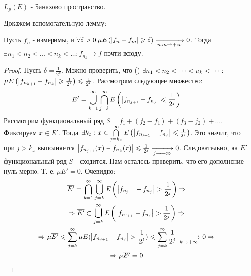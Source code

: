 \begin{theorem}
	$L_p(E) $ - Банахово пространство.
\end{theorem}

Докажем вспомогательную лемму:

\begin{lemma}
	Пусть $f_n$ - измеримы, и $\forall\delta > 0\: \mu E\left(\left|f_n - f_m\right| \geqslant \delta\right) \xrightarrow[n,m \rightarrow +\infty]{} 0$.
	Тогда $\exists n_1 < n_2 < \dots < n_k < \dots : f_{n_k} \rightarrow f$ почти всюду.
\end{lemma}

\begin{proof}
	Пусть $\delta = \frac{1}{2^k}$. Можно проверить, что (\todo) 
	$\exists n_1 < n_2 < \dots < n_k < \dots: \\$
	$\mu E\left(\left|f_{n_{k + 1}} - f_{n_k}\right| \geqslant \frac{1}{2^k}\right) \leqslant \frac{1}{2^k}$.
	Рассмотрим следующее множество:
	\begin{gather*}
		E' = \bigcup\limits_{k = 1}^{\infty}\bigcap\limits_{j = k}^{\infty} E\left(\left|f_{n_{j + 1}} - f_{n_j}\right| \leqslant \frac{1}{2^j} \right)
	\end{gather*}
	Рассмотрим функциональный ряд $S = f_1 + (f_2 - f_1) + (f_3 - f_2) + \dots$. Фиксируем $x \in E'$. Тогда 
	$\\ \exists k_x : x \in \bigcap\limits_{j = k_x}^{\infty} E\left(\left|f_{n_{j + 1}} - f_{n_j}\right| \leqslant \frac{1}{2^j} \right)$.
	Это значит, что при $j > k_x$ выполняется $\left|f_{n_{j + 1}}(x) - f_{n_k}(x)\right| \leqslant \frac{1}{2^j} \xrightarrow[j \rightarrow +\infty]{} 0$.
	Следовательно, на $E'$ функциональный ряд $S$ - сходится. 
	Нам осталось проверить, что его дополнение нуль-мерно.
	Т. е. $\mu \overline{E'} = 0$. Очевидно:
	\begin{gather*}
		\overline{E'} = \bigcap\limits_{k = 1}^{\infty}\bigcup\limits_{j = k}^{\infty} E\left(\left|f_{n_{j + 1}} - f_{n_j}\right| > \frac{1}{2^j} \right) \Rightarrow \\
		\Rightarrow \overline{E'} \subset \bigcup\limits_{j = k}^{\infty} E\left(\left|f_{n_{j + 1}} - f_{n_j}\right| > \frac{1}{2^j} \right) \Rightarrow \\
		\Rightarrow \mu \overline{E'} \leqslant \sum\limits_{j = k}^{\infty} \mu E(\left|f_{n_{j + 1}} - f_{n_j}\right| > \frac{1}{2^j}) \leqslant 
		\sum\limits_{j = k}^{\infty} \frac{1}{2^j} \xrightarrow[k \rightarrow +\infty]{} 0 \Rightarrow \\
		\Rightarrow \mu \overline{E'} = 0
	\end{gather*}
\end{proof}

